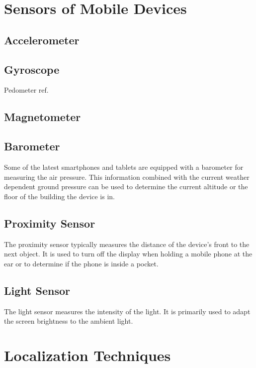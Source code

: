 \section{Sensors of Mobile Devices}

\subsection{Accelerometer}

\subsection{Gyroscope}

Pedometer ref.

\subsection{Magnetometer}

\subsection{Barometer}

Some of the latest smartphones and tablets are equipped with a barometer for measuring the air pressure. This information combined with the current weather dependent ground pressure can be used to determine the current altitude or the floor of the building the device is in. 

\subsection{Proximity Sensor}

The proximity sensor typically measures the distance of the device's front to the next object. It is used to turn off the display when holding a mobile phone at the ear or to determine if the phone is inside a pocket.

\subsection{Light Sensor}

The light sensor measures the intensity of the light. It is primarily used to adapt the screen brightness to the ambient light.

\section{Localization Techniques}

